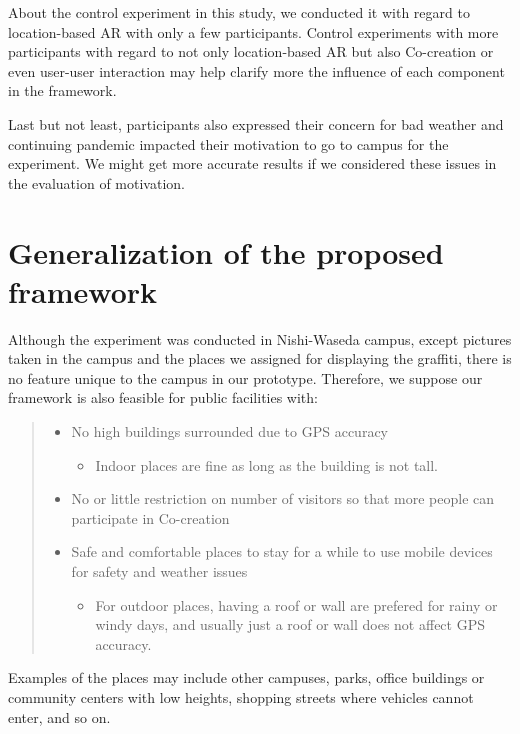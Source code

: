 About the control experiment in this study, we conducted it with regard to location-based AR with only a few participants.
Control experiments with more participants with regard to not only location-based AR but also Co-creation or even user-user interaction may help clarify more the influence of each component in the framework.

Last but not least, participants also expressed their concern for bad weather and continuing pandemic impacted their motivation to go to campus for the experiment.
We might get more accurate results if we considered these issues in the evaluation of motivation.

\section{Generalization of the proposed framework}

Although the experiment was conducted in Nishi-Waseda campus, except pictures taken in the campus and the places we assigned for displaying the graffiti,
there is no feature unique to the campus in our prototype.
Therefore, we suppose our framework is also feasible for public facilities with:
\begin{quote}
  \begin{itemize}
    \item No high buildings surrounded due to GPS accuracy
      \begin{itemize}
        \item Indoor places are fine as long as the building is not tall.
      \end{itemize}
    \item No or little restriction on number of visitors so that more people can participate in Co-creation
    \item Safe and comfortable places to stay for a while to use mobile devices for safety and weather issues
      \begin{itemize}
        \item For outdoor places, having a roof or wall are prefered for rainy or windy days, and usually just a roof or wall does not affect GPS accuracy.
      \end{itemize}
  \end{itemize}
\end{quote}

Examples of the places may include other campuses, parks, office buildings or community centers with low heights, shopping streets where vehicles cannot enter, and so on.